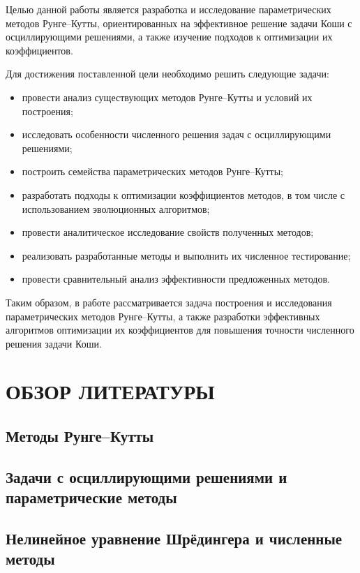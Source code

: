 Целью данной работы является разработка и исследование параметрических методов Рунге–Кутты, ориентированных на эффективное решение задачи Коши с осциллирующими решениями, а также изучение подходов к оптимизации их коэффициентов.

Для достижения поставленной цели необходимо решить следующие задачи:
\begin{itemize}
	\item провести анализ существующих методов Рунге–Кутты и условий их построения;
	\item исследовать особенности численного решения задач с осциллирующими решениями;
	\item построить семейства параметрических методов Рунге–Кутты;
	\item разработать подходы к оптимизации коэффициентов методов, в том числе с использованием эволюционных алгоритмов;
	\item провести аналитическое исследование свойств полученных методов;
	\item реализовать разработанные методы и выполнить их численное тестирование;
	\item провести сравнительный анализ эффективности предложенных методов.
\end{itemize}

Таким образом, в работе рассматривается задача построения и исследования параметрических методов Рунге–Кутты, а также разработки эффективных алгоритмов оптимизации их коэффициентов для повышения точности численного решения задачи Коши.

 \clearpage
\section{\centering ОБЗОР ЛИТЕРАТУРЫ}

\subsection{Методы Рунге–Кутты}

\subsection{Задачи с осциллирующими решениями и параметрические методы}

\subsection{Нелинейное уравнение Шрёдингера и численные методы}

